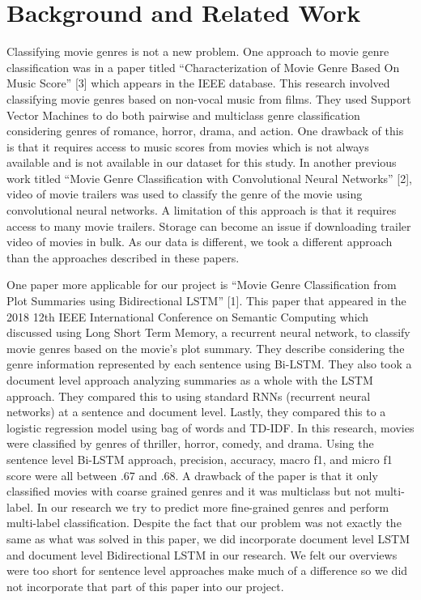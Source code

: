 \documentclass[sigconf]{acmart}
\begin{document}
\section{Background and Related Work}

Classifying movie genres is not a new problem. One approach to movie genre classification was in a paper titled ``Characterization of Movie Genre Based On Music Score'' [3] which appears in the IEEE database.  This research involved classifying movie genres based on non-vocal music from films.  They used Support Vector Machines to do both pairwise and multiclass genre classification considering genres of romance, horror, drama, and action.  One drawback of this is that it requires access to music scores from movies which is not always available and is not available in our dataset for this study.  In another previous work titled ``Movie Genre Classification with Convolutional Neural Networks'' [2], video of movie trailers was used to classify the genre of the movie using convolutional neural networks. A limitation of this approach is that it requires access to many movie trailers.  Storage can become an issue if downloading trailer video of movies in bulk. As our data is different, we took a different approach than the approaches described in these papers. 

One paper more applicable for our project is ``Movie Genre Classification from Plot Summaries using Bidirectional LSTM'' [1]. This paper that appeared in the 2018 12th IEEE International Conference on Semantic Computing which discussed using Long Short Term Memory, a recurrent neural network, to classify movie genres based on the movie's plot summary.  They describe considering the genre information represented by each sentence using Bi-LSTM. They also took a document level approach analyzing summaries as a whole with the LSTM approach.  They compared this to using standard RNNs (recurrent neural networks) at a sentence and document level.  Lastly, they compared this to a logistic regression model using bag of words and TD-IDF. In this research, movies were classified by genres of thriller, horror, comedy, and drama. Using the sentence level Bi-LSTM approach, precision, accuracy, macro f1, and micro f1 score were all between .67 and .68. A drawback of the paper is that it only classified movies with coarse grained genres and it was multiclass but not multi-label.  In our research we try to predict more fine-grained genres and perform multi-label classification. Despite the fact that our problem was not exactly the same as what was solved in this paper, we did incorporate document level LSTM and document level Bidirectional LSTM in our research. We felt our overviews were too short for sentence level approaches make much of a difference so we did not incorporate that part of this paper into our project. 
\end{document}
